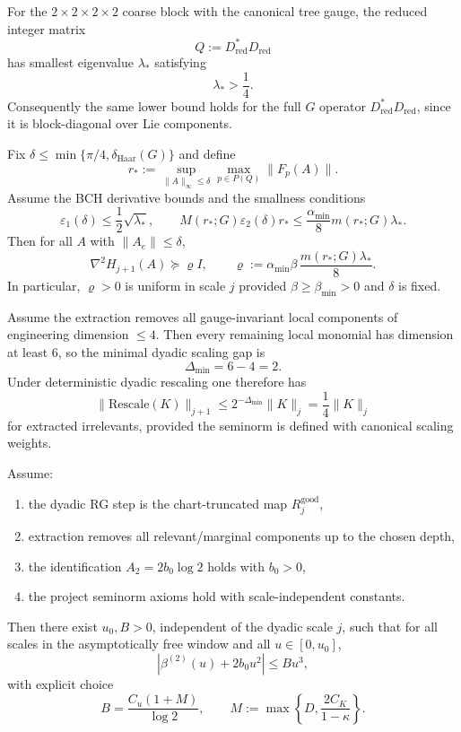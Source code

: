 \documentclass[preprint,aip,jmp,amsmath,amssymb,nofootinbib]{revtex4-2}
\begin{document}
\begin{lemma}
For the $2\times 2\times 2\times 2$ coarse block with the canonical tree gauge, the reduced integer matrix
\[
Q:=D_{\mathrm{red}}^\ast D_{\mathrm{red}}
\]
has smallest eigenvalue $\lambda_\ast$ satisfying
\[
\lambda_\ast > \frac14.
\]
Consequently the same lower bound holds for the full $G$ operator $D_{\mathrm{red}}^\ast D_{\mathrm{red}}$, since it is block-diagonal over Lie components.
\end{lemma}

\begin{theorem}
Fix $\delta\le \min\{\pi/4,\delta_{\mathrm{Haar}}(G)\}$ and define
\[
r_\ast := \sup_{\|A\|_\infty\le \delta}\max_{p\in P(Q)} \|F_p(A)\|.
\]
Assume the BCH derivative bounds and the smallness conditions
\[
\varepsilon_1(\delta)\le \frac12\sqrt{\lambda_\ast},
\qquad
M(r_\ast;G)\varepsilon_2(\delta)r_\ast \le \frac{\alpha_{\min}}{8}m(r_\ast;G)\lambda_\ast.
\]
Then for all $A$ with $\|A_e\|\le \delta$,
\[
\nabla^2 H_{j+1}(A)\succeq \varrho I,
\qquad
\varrho := \alpha_{\min}\beta\,\frac{m(r_\ast;G)\lambda_\ast}{8}.
\]
In particular, $\varrho>0$ is uniform in scale $j$ provided $\beta\ge \beta_{\min}>0$ and $\delta$ is fixed.
\end{theorem}

\begin{lemma}
Assume the extraction removes all gauge-invariant local components of engineering dimension $\le 4$. Then every remaining local monomial has dimension at least $6$, so the minimal dyadic scaling gap is
\[
\Delta_{\min}=6-4=2.
\]
Under deterministic dyadic rescaling one therefore has
\[
\|\mathrm{Rescale}(K)\|_{j+1}\le 2^{-\Delta_{\min}}\|K\|_j = \frac14\|K\|_j
\]
for extracted irrelevants, provided the seminorm is defined with canonical scaling weights.
\end{lemma}

\begin{theorem}
Assume:
\begin{enumerate}
\item the dyadic RG step is the chart-truncated map $R_j^{\mathrm{good}}$,
\item extraction removes all relevant/marginal components up to the chosen depth,
\item the identification $A_2=2b_0\log 2$ holds with $b_0>0$,
\item the project seminorm axioms hold with scale-independent constants.
\end{enumerate}
Then there exist $u_0,B>0$, independent of the dyadic scale $j$, such that for all scales in the asymptotically free window and all $u\in[0,u_0]$,
\[
|\beta^{(2)}(u)+2b_0u^2| \le Bu^3,
\]
with explicit choice
\[
B = \frac{C_u(1+M)}{\log 2},
\qquad
M:=\max\!\left\{D,\frac{2C_K}{1-\kappa}\right\}.
\]
\end{theorem}
\end{document}
